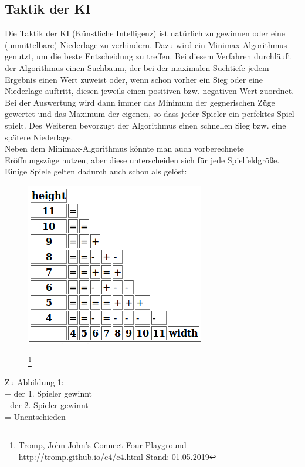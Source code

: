 \documentclass[12pt,a4paper,ngerman]{article}
\begin{document}
	\subsection{Taktik der KI}
	Die Taktik der KI (Künstliche Intelligenz) ist natürlich zu gewinnen oder eine (unmittelbare) Niederlage zu verhindern. Dazu wird ein Minimax-Algorithmus genutzt, um die beste Entscheidung zu treffen. Bei diesem Verfahren durchläuft der Algorithmus einen Suchbaum, der bei der maximalen Suchtiefe jedem Ergebnis einen Wert zuweist oder, wenn schon vorher ein Sieg oder eine Niederlage auftritt, diesen jeweils einen positiven bzw. negativen Wert zuordnet. Bei der Auswertung wird dann immer das Minimum der gegnerischen Züge gewertet und das Maximum der eigenen, so dass jeder Spieler ein \glqq perfektes \grqq{} Spiel spielt. Des Weiteren bevorzugt der Algorithmus einen schnellen Sieg bzw. eine spätere Niederlage.
		\\
	Neben dem Minimax-Algorithmus könnte man auch vorberechnete Eröffnungszüge nutzen, aber diese unterscheiden sich für jede Spielfeldgröße. Einige Spiele gelten dadurch auch schon als gelöst:
	\begin{figure}
		\centering
		\includegraphics[width=0.7\linewidth]{w-h-viergew}
		\caption{}
		\label{fig:w-h-viergew}
		\footnote{Tromp, John  \glqq John's Connect Four Playground \grqq{} \url{http://tromp.github.io/c4/c4.html} Stand: 01.05.2019}
	\end{figure}
    \newpage
	Zu Abbildung 1:\\
	+ der 1. Spieler gewinnt\\
	- der 2. Spieler gewinnt\\
	= Unentschieden\\
	
	
	
\end{document}
